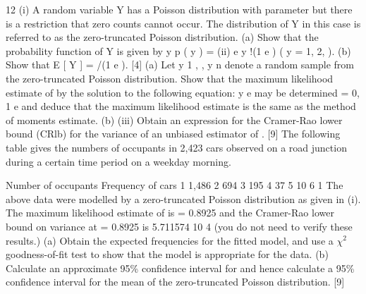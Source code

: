 \documentclass[a4paper,12pt]{article}
\begin{document}
\begin{enumerate}
12
(i)
A random variable Y has a Poisson distribution with parameter but there is a restriction that zero counts cannot occur. The distribution of Y in this case is referred to as the zero-truncated Poisson distribution.
(a)
Show that the probability function of Y is given by
y
p ( y ) =
(ii)
e
y !(1 e )
( y = 1, 2, ).
(b) Show that E [ Y ] = /(1 e ).
[4]
(a) Let y 1 , , y n denote a random sample from the zero-truncated Poisson distribution.
Show that the maximum likelihood estimate of by the solution to the following equation:
y
e
may be determined
= 0,
1 e
and deduce that the maximum likelihood estimate is the same as the method of moments estimate.
(b)
(iii)
Obtain an expression for the Cramer-Rao lower bound (CRlb) for the variance of an unbiased estimator of .
[9]
The following table gives the numbers of occupants in 2,423 cars observed on a road junction during a certain time period on a weekday morning.

Number of occupants
Frequency of cars
1
1,486
2
694
3
195
4
37
5
10
6
1
The above data were modelled by a zero-truncated Poisson distribution as given in (i).
The maximum likelihood estimate of is = 0.8925 and the Cramer-Rao lower bound on variance at = 0.8925 is 5.711574 10 4 (you do not need to verify these results.)
(a) Obtain the expected frequencies for the fitted model, and use a $\chi^2$ goodness-of-fit test to show that the model is appropriate for the data.
(b) Calculate an approximate 95\% confidence interval for and hence calculate a 95\% confidence interval for the mean of the zero-truncated Poisson distribution.
[9]
\newpage


\end{enumerate}
\end{document}
